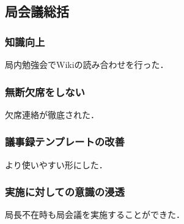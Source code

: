\subsection*{局会議総括}


\subsubsection*{知識向上}

局内勉強会でWikiの読み合わせを行った．

\subsubsection*{無断欠席をしない}

欠席連絡が徹底された．

\subsubsection*{議事録テンプレートの改善}

より使いやすい形にした．

\subsubsection*{実施に対しての意識の浸透}

局長不在時も局会議を実施することができた．
